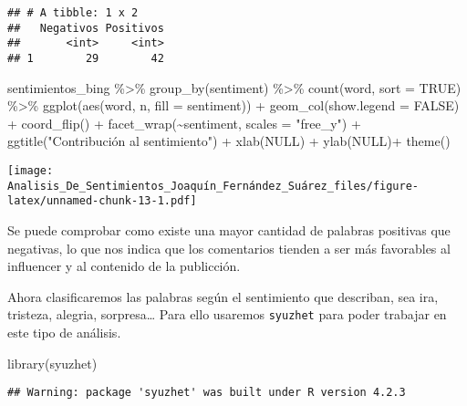 \documentclass[
]{article}
\newenvironment{Shaded}{\begin{snugshade}}{\end{snugshade}}
\newcommand{\AttributeTok}[1]{\textcolor[rgb]{0.77,0.63,0.00}{#1}}
\newcommand{\ConstantTok}[1]{\textcolor[rgb]{0.00,0.00,0.00}{#1}}
\newcommand{\FunctionTok}[1]{\textcolor[rgb]{0.00,0.00,0.00}{#1}}
\newcommand{\NormalTok}[1]{#1}
\newcommand{\SpecialCharTok}[1]{\textcolor[rgb]{0.00,0.00,0.00}{#1}}
\newcommand{\StringTok}[1]{\textcolor[rgb]{0.31,0.60,0.02}{#1}}
\begin{document}
\begin{verbatim}
## # A tibble: 1 x 2
##   Negativos Positivos
##       <int>     <int>
## 1        29        42
\end{verbatim}

\begin{Shaded}
\begin{Highlighting}[]
\NormalTok{sentimientos\_bing }\SpecialCharTok{\%\textgreater{}\%}
  \FunctionTok{group\_by}\NormalTok{(sentiment) }\SpecialCharTok{\%\textgreater{}\%}
  \FunctionTok{count}\NormalTok{(word, }\AttributeTok{sort =} \ConstantTok{TRUE}\NormalTok{) }\SpecialCharTok{\%\textgreater{}\%}
  \FunctionTok{ggplot}\NormalTok{(}\FunctionTok{aes}\NormalTok{(word, n, }\AttributeTok{fill =}\NormalTok{ sentiment)) }\SpecialCharTok{+}
  \FunctionTok{geom\_col}\NormalTok{(}\AttributeTok{show.legend =} \ConstantTok{FALSE}\NormalTok{) }\SpecialCharTok{+} 
    \FunctionTok{coord\_flip}\NormalTok{() }\SpecialCharTok{+} \FunctionTok{facet\_wrap}\NormalTok{(}\SpecialCharTok{\textasciitilde{}}\NormalTok{sentiment, }\AttributeTok{scales =} \StringTok{"free\_y"}\NormalTok{) }\SpecialCharTok{+} 
    \FunctionTok{ggtitle}\NormalTok{(}\StringTok{"Contribución al sentimiento"}\NormalTok{) }\SpecialCharTok{+} \FunctionTok{xlab}\NormalTok{(}\ConstantTok{NULL}\NormalTok{) }\SpecialCharTok{+} \FunctionTok{ylab}\NormalTok{(}\ConstantTok{NULL}\NormalTok{)}\SpecialCharTok{+}
  \FunctionTok{theme}\NormalTok{()}
\end{Highlighting}
\end{Shaded}

\texttt{[image: Analisis\_De\_Sentimientos\_Joaquín\_Fernández\_Suárez\_files/figure-latex/unnamed-chunk-13-1.pdf]}

Se puede comprobar como existe una mayor cantidad de palabras positivas
que negativas, lo que nos indica que los comentarios tienden a ser más
favorables al influencer y al contenido de la publicción.

Ahora clasificaremos las palabras según el sentimiento que describan,
sea ira, tristeza, alegria, sorpresa\ldots{} Para ello usaremos
\texttt{syuzhet} para poder trabajar en este tipo de análisis.

\begin{Shaded}
\begin{Highlighting}[]
\FunctionTok{library}\NormalTok{(syuzhet)}
\end{Highlighting}
\end{Shaded}

\begin{verbatim}
## Warning: package 'syuzhet' was built under R version 4.2.3
\end{verbatim}
\end{document}
